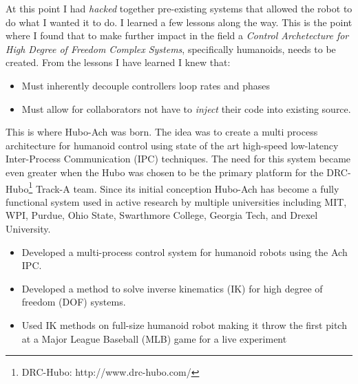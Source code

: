 \noindent 
At this point I had \textit{hacked} together pre-existing systems that allowed the robot to do what I wanted it to do.  
I learned a few lessons along the way.
This is the point where I found that to make further impact in the field a \textit{Control Archetecture for High Degree of Freedom Complex Systems}, specifically humanoids, needs to be created.
From the lessons I have learned I knew that:
\begin{itemize}
\item Must inherently decouple controllers loop rates and phases
\item Must allow for collaborators not have to \textit{inject} their code into existing source.
\end{itemize}
\noindent This is where Hubo-Ach was born.
The idea was to create a multi process architecture for humanoid control using state of the art high-speed low-latency Inter-Process Communication (IPC) techniques\cite{lofaroRAM2013}.
The need for this system became even greater when the Hubo was chosen to be the primary platform for the DRC-Hubo\footnote{DRC-Hubo: http://www.drc-hubo.com/} Track-A team.
Since its initial conception Hubo-Ach has become a fully functional system used in active research by multiple universities including MIT, WPI, Purdue, Ohio State, Swarthmore College, Georgia Tech, and Drexel University\cite{lofaroTePRA2013HuboAch,lofaroTePRA2013Valve}.

\begin{itemize}
\item Developed a multi-process control system for humanoid robots using the Ach IPC.
\item Developed a method to solve inverse kinematics (IK) for high degree of freedom (DOF) systems.
\item Used IK methods on full-size humanoid robot making it throw the first pitch at a Major League Baseball (MLB) game for a live experiment
\end{itemize}